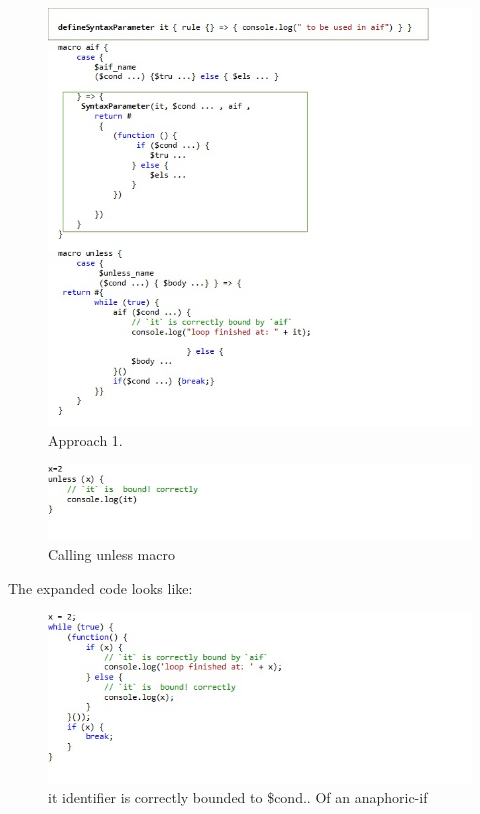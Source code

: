 \begin{figure}[htb]
\centering
\includegraphics[width=1.0\textwidth]{images/Appraoch1.jpg}
\caption{Approach 1.} 
\label{fig:AST1}
\end{figure}
\begin{figure}[htb]
\centering
\includegraphics[width=1.0\textwidth]{images/Appraoch2.jpg}
\caption{Calling unless macro} 
\label{fig:AST2}

\end{figure}

The expanded code looks like:

\begin{figure}[htb]
\centering
\includegraphics[width=1.0\textwidth]{images/Appraoch3.jpg}
\caption{ it identifier is correctly bounded to \$cond.. Of an anaphoric-if} 
\label{fig:AST3}

\end{figure}

